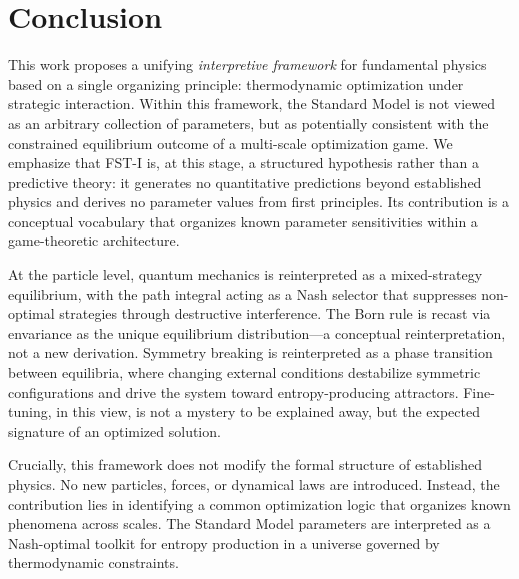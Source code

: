 \documentclass[12pt,a4paper]{article}
\theoremstyle{remark}
\begin{document}
\section{Conclusion}
\label{sec:conclusion}

This work proposes a unifying \emph{interpretive framework} for fundamental physics based on a single organizing principle: thermodynamic optimization under strategic interaction. Within this framework, the Standard Model is not viewed as an arbitrary collection of parameters, but as potentially consistent with the constrained equilibrium outcome of a multi-scale optimization game. We emphasize that FST-I is, at this stage, a structured hypothesis rather than a predictive theory: it generates no quantitative predictions beyond established physics and derives no parameter values from first principles. Its contribution is a conceptual vocabulary that organizes known parameter sensitivities within a game-theoretic architecture.

At the particle level, quantum mechanics is reinterpreted as a mixed-strategy equilibrium, with the path integral acting as a Nash selector that suppresses non-optimal strategies through destructive interference. The Born rule is recast via envariance as the unique equilibrium distribution---a conceptual reinterpretation, not a new derivation. Symmetry breaking is reinterpreted as a phase transition between equilibria, where changing external conditions destabilize symmetric configurations and drive the system toward entropy-producing attractors. Fine-tuning, in this view, is not a mystery to be explained away, but the expected signature of an optimized solution.

Crucially, this framework does not modify the formal structure of established physics. No new particles, forces, or dynamical laws are introduced. Instead, the contribution lies in identifying a common optimization logic that organizes known phenomena across scales. The Standard Model parameters are interpreted as a Nash-optimal toolkit for entropy production in a universe governed by thermodynamic constraints.
\end{document}
